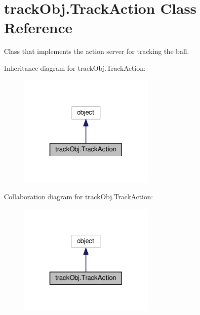 \hypertarget{classtrackObj_1_1TrackAction}{}\section{track\+Obj.\+Track\+Action Class Reference}
\label{classtrackObj_1_1TrackAction}


Class that implements the action server for tracking the ball.  




Inheritance diagram for track\+Obj.\+Track\+Action\+:
\nopagebreak
\begin{figure}[H]
\begin{center}
\leavevmode
\includegraphics[width=189pt]{classtrackObj_1_1TrackAction__inherit__graph}
\end{center}
\end{figure}


Collaboration diagram for track\+Obj.\+Track\+Action\+:
\nopagebreak
\begin{figure}[H]
\begin{center}
\leavevmode
\includegraphics[width=189pt]{classtrackObj_1_1TrackAction__coll__graph}
\end{center}
\end{figure}
